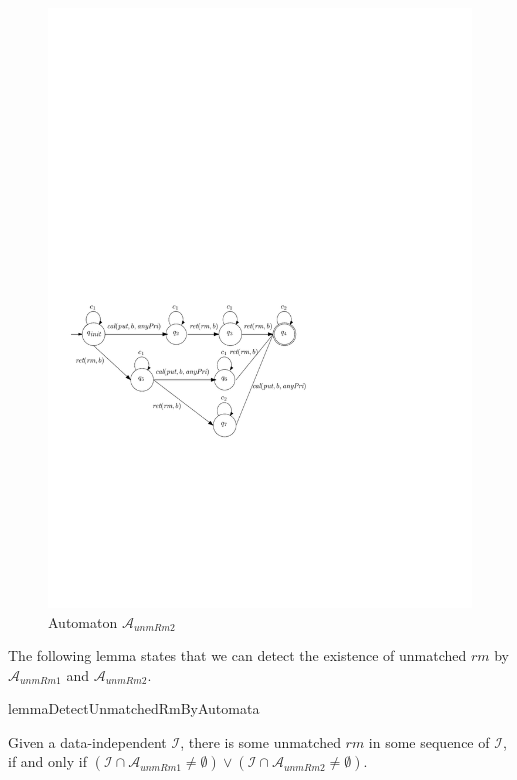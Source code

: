 \documentclass{llncs}
\begin{document}
\begin{figure}[htbp]
  \centering
  \includegraphics[width=0.5 \textwidth]{PIC_AUTO_UNMATCHED_RM2.pdf}
  \caption{Automaton $\mathcal{A}_{\textit{unmRm2}}$}
  \label{fig:automata for unmatched rm2}
\end{figure}



The following lemma states that we can detect the existence of unmatched $\textit{rm}$ by $\mathcal{A}_{\textit{unmRm1}}$ and $\mathcal{A}_{\textit{unmRm2}}$.

\begin{restatable}{lemma}{DetectUnmatchedRmByAutomata}
\label{lemma:detect unmatched rm by automata}

Given a data-independent $\mathcal{I}$, there is some unmatched $\textit{rm}$ in some sequence of $\mathcal{I}$, if and only if $( \mathcal{I} \cap \mathcal{A}_{\textit{unmRm1}} \neq \emptyset) \vee ( \mathcal{I} \cap \mathcal{A}_{\textit{unmRm2}} \neq \emptyset )$.
\end{restatable}
\end{document}
